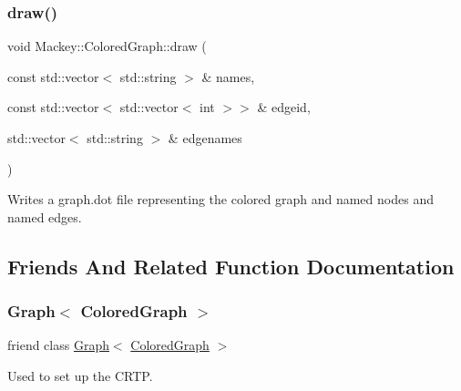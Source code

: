 \subsubsection{\texorpdfstring{draw()}{draw()}\hspace{0.1cm}{\footnotesize\ttfamily [3/3]}}
{\footnotesize\ttfamily void Mackey\+::\+Colored\+Graph\+::draw (\begin{DoxyParamCaption}\item[{const std\+::vector$<$ std\+::string $>$ \&}]{names,  }\item[{const std\+::vector$<$ std\+::vector$<$ int $>$$>$ \&}]{edgeid,  }\item[{std\+::vector$<$ std\+::string $>$ \&}]{edgenames }\end{DoxyParamCaption})}



Writes a graph.\+dot file representing the colored graph and named nodes and named edges. 



\subsection{Friends And Related Function Documentation}
\mbox{\label{classMackey_1_1ColoredGraph_a2debfc8158c19d7b93550156a3e2676a}} 
\subsubsection{\texorpdfstring{Graph$<$ Colored\+Graph $>$}{Graph< ColoredGraph >}}
{\footnotesize\ttfamily friend class \hyperlink{classMackey_1_1Graph}{Graph}$<$ \hyperlink{classMackey_1_1ColoredGraph}{Colored\+Graph} $>$\hspace{0.3cm}{\ttfamily [friend]}}



Used to set up the C\+R\+TP. 

\mbox{\label{classMackey_1_1ColoredGraph_a4a5a1a2093897e5ce4cabec8f82f5c9c}} 
